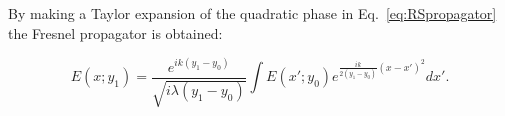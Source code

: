 \documentclass{iucr}              %
\begin{document}
By making a Taylor expansion of the quadratic phase in Eq.~\ref{eq:RSpropagator} the Fresnel propagator is obtained: 

\begin{equation}\label{eq:fresnelPropagator}
E(x;y_1) =  \frac{e^{i k (y_1-y_0)}}{\sqrt{i \lambda (y_1-y_0)}} \int E(x';y_0) e^{ \frac{i k}{2 (y_1-y_0)}  (x-x')^2  }  dx'.
\end{equation}


%


%
\end{document}
